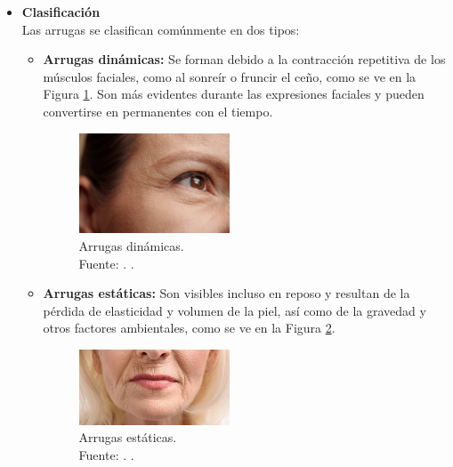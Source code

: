 \begin{itemize}
	\item \textbf{Clasificación}\\
Las arrugas se clasifican comúnmente en dos tipos:
\begin{itemize}
\item \textbf{Arrugas dinámicas:} Se forman debido a la contracción repetitiva de los músculos faciales, como al sonreír o fruncir el ceño, como se ve en la Figura \ref{2:ardin}. Son más evidentes durante las expresiones faciales y pueden convertirse en permanentes con el tiempo. \parencite{yoon2023}

\begin{figure}[H]
		\begin{center}
			\includegraphics[width=0.45\textwidth]{2/figures/arrugas dinamicas.jpg}
			\caption[Arrugas dinámicas]{Arrugas dinámicas.\\
			Fuente: \cite{medicinaesteticaregenerativa}. .}
			\label{2:ardin}
		\end{center}
	\end{figure}

\item \textbf{Arrugas estáticas:} Son visibles incluso en reposo y resultan de la pérdida de elasticidad y volumen de la piel, así como de la gravedad y otros factores ambientales, como se ve en la Figura \ref{2:arest}. \parencite{yoon2023}

\begin{figure}[H]
		\begin{center}
			\includegraphics[width=0.45\textwidth]{2/figures/arrugas estaticas.jpeg}
			\caption[Arrugas estáticas]{Arrugas estáticas.\\
			Fuente: \cite{dermatologiavelazquez}. .}
			\label{2:arest}
		\end{center}
	\end{figure}



\end{itemize}
\end{itemize}
